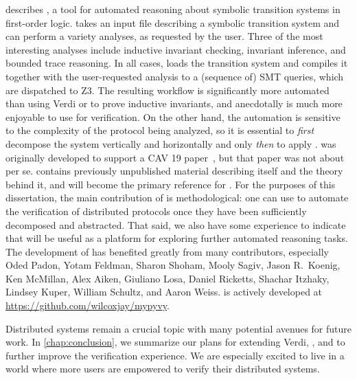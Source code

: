  describes \mypyvy,
  a tool for automated reasoning
  about symbolic transition systems in first-order logic.
\mypyvy takes an input file
  describing a symbolic transition system
  and can perform a variety analyses, as requested by the user.
Three of the most interesting analyses include
  inductive invariant checking,
  invariant inference, and
  bounded trace reasoning.
In all cases, \mypyvy loads the transition system
  and compiles it together with the user-requested analysis
  to a (sequence of) SMT queries,
  which are dispatched to Z3.
The resulting workflow is significantly more automated than using Verdi or \disel
  to prove inductive invariants, and anecdotally is much more enjoyable to use for verification.
On the other hand, the automation is sensitive to the complexity of the protocol being analyzed,
  so it is essential to \emph{first} decompose the system vertically and horizontally
  and only \emph{then} to apply \mypyvy.
\mypyvy was originally developed to support a CAV 19 paper~\cite{phase-updr},
  but that paper was not about \mypyvy per se.
 contains previously unpublished material describing \mypyvy itself
  and the theory behind it,
  and will become the primary reference for \mypyvy.
For the purposes of this dissertation,
  the main contribution of  is methodological:
  one can use \mypyvy to automate the verification of distributed protocols
  once they have been sufficiently decomposed and abstracted.
That said, we also have some experience to indicate
  that \mypyvy will be useful as a platform for exploring further automated reasoning tasks.
The development of \mypyvy has benefited greatly from many contributors,
  especially Oded Padon, Yotam Feldman, Sharon Shoham, Mooly Sagiv, Jason R.\ Koenig,
  Ken McMillan, Alex Aiken, Giuliano Losa,
  Daniel Ricketts, Shachar Itzhaky, Lindsey Kuper, William Schultz, and Aaron Weiss.
\mypyvy is actively developed at \url{https://github.com/wilcoxjay/mypyvy}.

Distributed systems remain a crucial topic
  with many potential avenues for future work.
In \cref{chap:conclusion},
  we summarize our plans
  for extending Verdi, \disel, and \mypyvy
  to further improve the verification experience.
We are especially excited
  to live in a world where more users
  are empowered to verify their distributed systems.